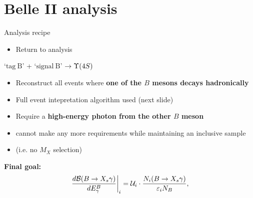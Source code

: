 \documentclass[xcolor=dvipsnames]{beamer}
\begin{document}
   \section{Belle II analysis}

   \begin{frame}{Analysis recipe}
      \scriptsize\centering
      \begin{itemize}
         \item Return to \BtoXsgamma analysis
      \end{itemize}
      
      `$\mathrm{tag~B}$' + `$\mathrm{signal~B}$' $\ra \FourS$
     
      \begin{itemize}
         \item Reconstruct all events where \textbf{one of the $B$ mesons decays hadronically}
         \item[\to] Full event intepretation algorithm used (next slide)
         \item Require a \textbf{high-energy photon from the other $B$ meson}
         \item[\to] cannot make any more requirements while maintaining an inclusive sample 
         \item[] (i.e. no $M_X$ selection)
      \end{itemize}
\textbf{Final goal:}
      \begin{equation}\nonumber
         \left.\frac{d\mathcal{B}(\BtoXsgamma)}{d\EB}\right|_i = \mathcal{U}_i \cdot \frac{N_i(\BtoXsgamma)}{\varepsilon_i N_{B}},
      \end{equation}
   \end{frame}
\end{document}

